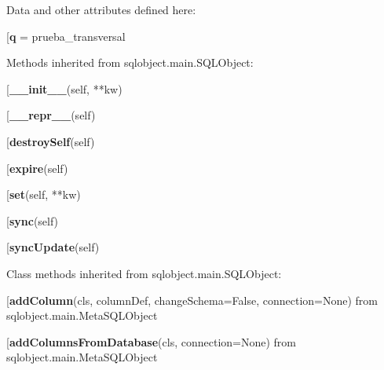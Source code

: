 Data and other attributes defined here:\\
\begin{description}\item[{\bf q} = prueba\_transversal\end{description}


Methods inherited from sqlobject.main.SQLObject:\\
\begin{description}\item[{\bf \_\_init\_\_}(self, **kw)\end{description}

\begin{description}\item[{\bf \_\_repr\_\_}(self)\end{description}

\begin{description}\item[{\bf destroySelf}(self)\end{description}

\begin{description}\item[{\bf expire}(self)\end{description}

\begin{description}\item[{\bf set}(self, **kw)\end{description}

\begin{description}\item[{\bf sync}(self)\end{description}

\begin{description}\item[{\bf syncUpdate}(self)\end{description}


Class methods inherited from sqlobject.main.SQLObject:\\
\begin{description}\item[{\bf addColumn}(cls, columnDef, changeSchema=False, connection=None) from sqlobject.main.MetaSQLObject\end{description}

\begin{description}\item[{\bf addColumnsFromDatabase}(cls, connection=None) from sqlobject.main.MetaSQLObject\end{description}

